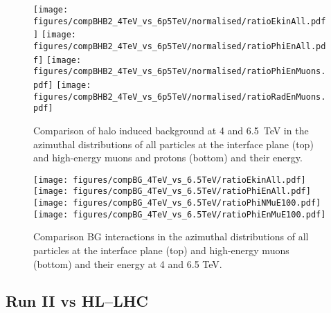 \begin{figure}%
\begin{center}
  \texttt{[image: figures/compBHB2\_4TeV\_vs\_6p5TeV/normalised/ratioEkinAll.pdf]}
  \texttt{[image: figures/compBHB2\_4TeV\_vs\_6p5TeV/normalised/ratioPhiEnAll.pdf]}
  \texttt{[image: figures/compBHB2\_4TeV\_vs\_6p5TeV/normalised/ratioPhiEnMuons.pdf]}
  \texttt{[image: figures/compBHB2\_4TeV\_vs\_6p5TeV/normalised/ratioRadEnMuons.pdf]}
\end{center}
\vspace{-0.6cm}
 \caption{Comparison of halo induced background at 4 and 6.5~TeV in the azimuthal distributions of all particles at the interface plane (top) and high-energy muons and protons (bottom) and their energy.
  \label{compBHB2run1run2}}
\end{figure}



\begin{figure}%
\begin{center}
  \texttt{[image: figures/compBG\_4TeV\_vs\_6.5TeV/ratioEkinAll.pdf]}
  \texttt{[image: figures/compBG\_4TeV\_vs\_6.5TeV/ratioPhiEnAll.pdf]}
  \texttt{[image: figures/compBG\_4TeV\_vs\_6.5TeV/ratioPhiNMuE100.pdf]}
  \texttt{[image: figures/compBG\_4TeV\_vs\_6.5TeV/ratioPhiEnMuE100.pdf]}
\end{center}
\vspace{-0.6cm}
 \caption{Comparison BG interactions in the azimuthal distributions of all particles at the interface plane (top) and high-energy muons (bottom) and their energy at 4 and 6.5 TeV.
  \label{compBGrun1run2}}
\end{figure}


\subsection{Run II vs HL--LHC}

